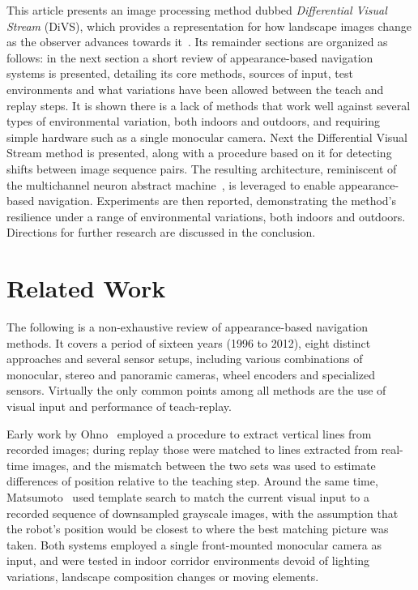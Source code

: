 \documentclass[twocolumn, 9pt,fleqn]{jsproceedings}
\begin{document}
This article presents an image processing method dubbed \textit{Differential Visual Stream} (DiVS), which provides a representation for how landscape images change as the observer advances towards it~\cite{HEL14a}. Its remainder sections are organized as follows: in the next section a short review of appearance-based navigation systems is presented, detailing its core methods, sources of input, test environments and what variations have been allowed between the teach and replay steps. It is shown there is a lack of methods that work well against several types of environmental variation, both indoors and outdoors, and requiring simple hardware such as a single monocular camera. Next the Differential Visual Stream method is presented, along with a procedure based on it for detecting shifts between image sequence pairs. The resulting architecture, reminiscent of the multichannel neuron abstract machine~\cite{HEL14b}, is leveraged to enable appearance-based navigation. Experiments are then reported, demonstrating the method's resilience under a range of environmental variations, both indoors and outdoors. Directions for further research are discussed in the conclusion.

\section{Related Work}

The following is a non-exhaustive review of appearance-based navigation methods. It covers a period of sixteen years (1996 to 2012), eight distinct approaches and several sensor setups, including various combinations of monocular, stereo and panoramic cameras, wheel encoders and specialized sensors. Virtually the only common points among all methods are the use of visual input and performance of teach-replay.

Early work by Ohno~\cite{OYA96} employed a procedure to extract vertical lines from recorded images; during replay those were matched to lines extracted from real-time images, and the mismatch between the two sets was used to estimate differences of position relative to the teaching step. Around the same time, Matsumoto~\cite{MAT96} used template search to match the current visual input to a recorded sequence of downsampled grayscale images, with the assumption that the robot's position would be closest to where the best matching picture was taken. Both systems employed a single front-mounted monocular camera as input, and were tested in indoor corridor environments devoid of lighting variations, landscape composition changes or moving elements.
\end{document}
